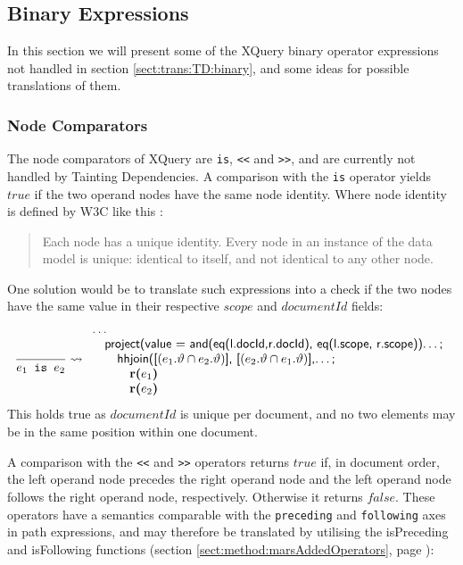 \subsection{Binary Expressions}

In this section we will present some of the XQuery binary operator expressions not handled in section
\ref{sect:trans:TD:binary}, and some ideas for possible translations of them.

\subsubsection{Node Comparators}

The node comparators of XQuery are \texttt{is}, \texttt{<<} and \texttt{>>}, and are currently not handled by
Tainting Dependencies. A comparison with the \texttt{is} operator yields $true$ if the two operand nodes have the
same node identity. Where node identity is defined by W3C like this \cite{w3c04}:
\begin{quote}
Each node has a unique identity. Every node in an instance of the data model is unique: identical to itself, and
not identical to any other node.
\end{quote}

One solution would be to translate such expressions into a check if the two nodes have the same value in their
respective $scope$ and $documentId$ fields:
\begin{equation*}
\frac{}{e_1 \mbox{\texttt{ is }} e_2} \leadsto
\begin{array}{l}
\mbox{\textsf{\ldots}} \\ \quad
\mbox{\textsf{project(value = and(eq(l.docId,r.docId), eq(l.scope, r.scope))\ldots;}} \\ \quad\quad
\mbox{\textsf{hhjoin([}}(e_1.\vartheta\cap e_2.\vartheta)\mbox{\textsf{], [}}(e_2.\vartheta\cap e_1.\vartheta)
\mbox{\textsf{],\ldots;}} \\ \quad\quad \quad
\mbox{\textbf{r(}}e_1\mbox{\textbf{)}} \\ \quad\quad \quad
\mbox{\textbf{r(}}e_2\mbox{\textbf{)}}
\end{array}
\end{equation*}
This holds true as $documentId$ is unique per document, and no two elements may be in the same position within one
document.

A comparison with the \texttt{<<} and \texttt{>>} operators returns $true$ if, in document order, the left operand
node precedes the right operand node and the left operand node follows the right operand node, respectively.
Otherwise it returns $false$. These operators have a semantics comparable with the \texttt{preceding} and
\texttt{following} axes in path expressions, and may therefore be translated by utilising the \textsf{isPreceding}
and \textsf{isFollowing} functions (section \ref{sect:method:marsAddedOperators}, page
\pageref{sect:method:marsAddedOperators}):

